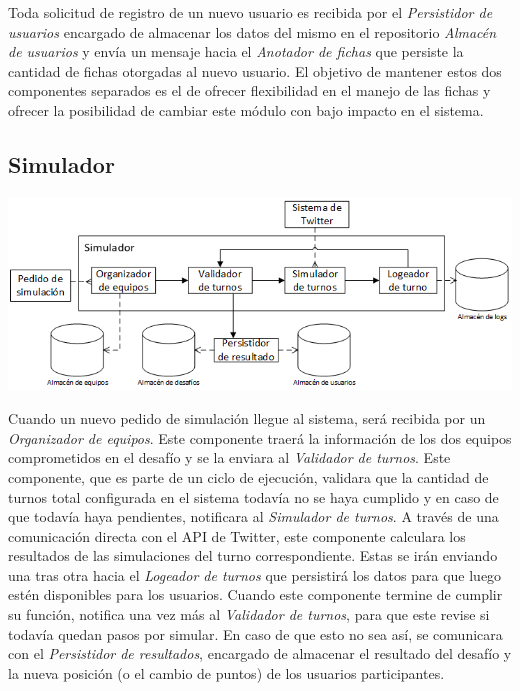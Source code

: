 Toda solicitud de registro de un nuevo usuario es recibida por el \emph{Persistidor de usuarios} encargado de almacenar los datos del mismo en el repositorio \emph{Almacén de usuarios} y envía un mensaje hacia el \emph{Anotador de fichas} que persiste la cantidad de fichas otorgadas al nuevo usuario. El objetivo de mantener estos dos componentes separados es el de ofrecer flexibilidad en el manejo de las fichas y ofrecer la posibilidad de cambiar este módulo con bajo impacto en el sistema.

\subsection{Simulador}
\begin{center}
\includegraphics[scale=0.80]{diagramas/tp1/simulador.png}
\end{center}
\label{fig:simulador}

Cuando un nuevo pedido de simulación llegue al sistema, será recibida por un \emph{Organizador de equipos}. Este componente traerá la información de los dos equipos comprometidos en el desafío y se la enviara al \emph{Validador de turnos}. Este componente, que es parte de un ciclo de ejecución, validara que la cantidad de turnos total configurada en el sistema todavía no se haya cumplido y en caso de que todavía haya pendientes, notificara al \emph{Simulador de turnos}. A través de una comunicación directa con el API de Twitter, este componente calculara los resultados de las simulaciones del turno correspondiente. Estas se irán enviando una tras otra hacia el \emph{Logeador  de turnos} que persistirá los datos para que luego estén disponibles para los usuarios. Cuando este componente termine de cumplir su función, notifica una vez más al \emph{Validador de turnos}, para que este revise si todavía quedan pasos por simular. En caso de que esto no sea así, se comunicara con el \emph{Persistidor de resultados}, encargado de almacenar el resultado del desafío y la nueva posición (o el cambio de puntos) de los usuarios participantes.